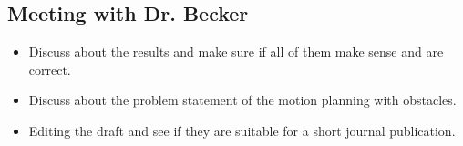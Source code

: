 \subsection{Meeting with Dr. Becker  }

\begin{itemize}
\item Discuss about the results and make sure if all of them make sense and are correct.
\item Discuss about the problem statement of the motion planning with obstacles.
\item Editing the draft and see if they are suitable for a short journal publication.
\end{itemize}


